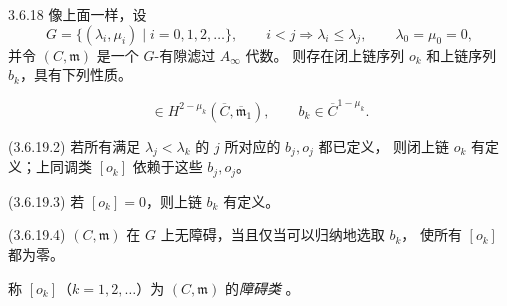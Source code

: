 \begin{theorem}{3.6.18}\label{thm:3-6-18}
像上面一样，设
\[
  G=\{(\lambda_i,\mu_i)\mid i=0,1,2,\ldots\},
  \qquad
  i<j\Longrightarrow\lambda_i\leq\lambda_j,
  \qquad \lambda_0=\mu_0=0,
\]
并令 $(C,\mathfrak m)$ 是一个 $G$-有隙滤过 $A_\infty$ 代数。
则存在闭上链序列 $o_k$ 和上链序列 $b_k$，具有下列性质。

\smallskip
\begin{equation}
  [o_k]\in H^{2-\mu_k}(\overline C,\overline{\mathfrak m}_1),
  \qquad b_k\in\overline C^{1-\mu_k}.
  \tag{3.6.19.1}\label{eq:3-6-19-1}
\end{equation}

\noindent\textup{(3.6.19.2)}
若所有满足 $\lambda_j<\lambda_k$ 的 $j$ 所对应的 $b_j,o_j$ 都已定义，
则闭上链 $o_k$ 有定义；上同调类 $[o_k]$ 依赖于这些 $b_j,o_j$。

\noindent\textup{(3.6.19.3)}
若 $[o_k]=0$，则上链 $b_k$ 有定义。

\noindent\textup{(3.6.19.4)}
$(C,\mathfrak m)$ 在 $G$ 上无障碍，当且仅当可以归纳地选取 $b_k$，
使所有 $[o_k]$ 都为零。
\end{theorem}

称 $[o_k]$（$k=1,2,\ldots$）为 $(C,\mathfrak m)$ 的\emph{障碍类}
。

